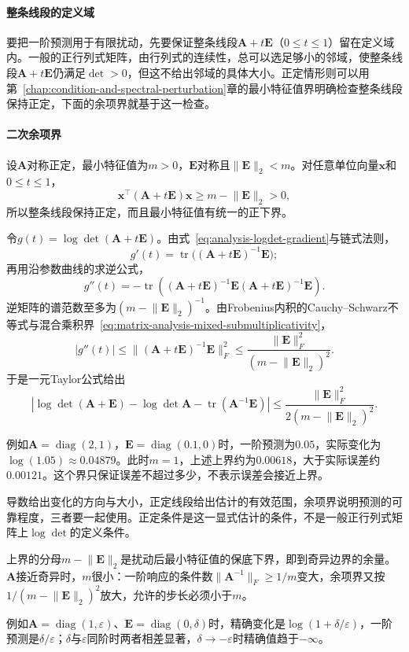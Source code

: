 \paragraph{整条线段的定义域}
要把一阶预测用于有限扰动，先要保证整条线段$\bm A+t\bm E$（$0\leq t\leq1$）留在定义域内。一般的正行列式矩阵，由行列式的连续性，总可以选足够小的邻域，使整条线段$\bm A+t\bm E$仍满足$\det>0$，但这不给出邻域的具体大小。正定情形则可以用第~\ref{chap:condition-and-spectral-perturbation}章的最小特征值界明确检查整条线段保持正定，下面的余项界就基于这一检查。

\paragraph{二次余项界}
设$\bm A$对称正定，最小特征值为$m>0$，$\bm E$对称且$\lVert\bm E\rVert_2<m$。对任意单位向量$\bm x$和$0\leq t\leq1$，
\[
 \bm x^\top(\bm A+t\bm E)\bm x\geq m-\lVert\bm E\rVert_2>0 ,
\]
所以整条线段保持正定，而且最小特征值有统一的正下界。

令$g(t)=\log\det(\bm A+t\bm E)$。由式~\eqref{eq:analysis-logdet-gradient}与链式法则，
\[
 g'(t)=\operatorname{tr}\bigl((\bm A+t\bm E)^{-1}\bm E\bigr);
\]
再用沿参数曲线的求逆公式，
\[
 g''(t)=-\operatorname{tr}\!\left((\bm A+t\bm E)^{-1}\bm E
 (\bm A+t\bm E)^{-1}\bm E\right).
\]
逆矩阵的谱范数至多为$(m-\lVert\bm E\rVert_2)^{-1}$。由Frobenius内积的Cauchy--Schwarz不等式与混合乘积界~\eqref{eq:matrix-analysis-mixed-submultiplicativity}，
\[
 |g''(t)|\leq\lVert(\bm A+t\bm E)^{-1}\bm E\rVert_F^2\leq\frac{\lVert\bm E\rVert_F^2}{(m-\lVert\bm E\rVert_2)^2}.
\]
于是一元Taylor公式给出
\begin{equation}
 \left|\log\det(\bm A+\bm E)-\log\det\bm A
 -\operatorname{tr}(\bm A^{-1}\bm E)\right|
 \leq\frac{\lVert\bm E\rVert_F^2}{2(m-\lVert\bm E\rVert_2)^2}.
\label{eq:multivariable-logdet-remainder-bound}
\end{equation}

例如$\bm A=\operatorname{diag}(2,1)$，$\bm E=\operatorname{diag}(0.1,0)$时，一阶预测为$0.05$，实际变化为$\log(1.05)\approx0.04879$。此时$m=1$，上述上界约为$0.00618$，大于实际误差约$0.00121$。这个界只保证误差不超过多少，不表示误差会接近上界。

导数给出变化的方向与大小，正定线段给出估计的有效范围，余项界说明预测的可靠程度，三者要一起使用。正定条件是这一显式估计的条件，不是一般正行列式矩阵上$\log\det$的定义条件。

上界的分母$m-\lVert\bm E\rVert_2$是扰动后最小特征值的保底下界，即到奇异边界的余量。$\bm A$接近奇异时，$m$很小：一阶响应的条件数$\lVert\bm A^{-1}\rVert_F\geq1/m$变大，余项界又按$1/(m-\lVert\bm E\rVert_2)^2$放大，允许的步长必须小于$m$。

例如$\bm A=\operatorname{diag}(1,\varepsilon)$、$\bm E=\operatorname{diag}(0,\delta)$时，精确变化是$\log(1+\delta/\varepsilon)$，一阶预测是$\delta/\varepsilon$；$\delta$与$\varepsilon$同阶时两者相差显著，$\delta\to-\varepsilon$时精确值趋于$-\infty$。
